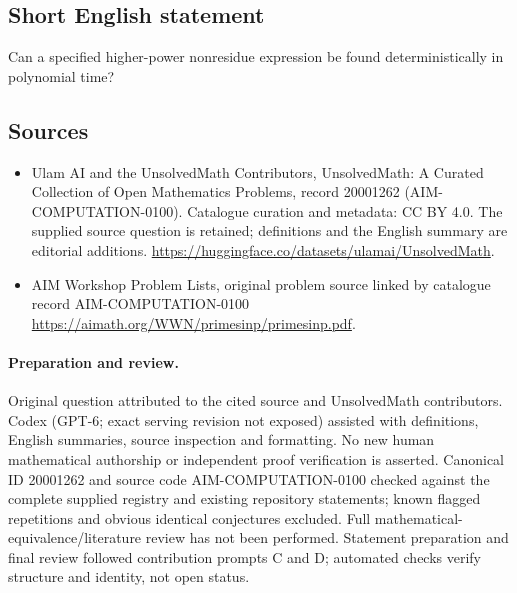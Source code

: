 \documentclass[11pt]{article}
\begin{document}
\subsection{Short English statement}
Can a specified higher-power nonresidue expression be found deterministically in polynomial time?
\subsection{Sources}
\begin{itemize}
\item[\hypertarget{source:20001262:1}{S1}] Ulam AI and the UnsolvedMath Contributors, UnsolvedMath: A Curated Collection of Open Mathematics Problems, record 20001262 (AIM-COMPUTATION-0100). Catalogue curation and metadata: CC BY 4.0. The supplied source question is retained; definitions and the English summary are editorial additions.
\url{https://huggingface.co/datasets/ulamai/UnsolvedMath}.
\item[\hypertarget{source:20001262:2}{S2}] AIM Workshop Problem Lists, original problem source linked by catalogue record AIM-COMPUTATION-0100
\url{https://aimath.org/WWN/primesinp/primesinp.pdf}.
\end{itemize}
\paragraph{Preparation and review.}
Original question attributed to the cited source and UnsolvedMath contributors. Codex (GPT-6; exact serving revision not exposed) assisted with definitions, English summaries, source inspection and formatting. No new human mathematical authorship or independent proof verification is asserted. Canonical ID 20001262 and source code AIM-COMPUTATION-0100 checked against the complete supplied registry and existing repository statements; known flagged repetitions and obvious identical conjectures excluded. Full mathematical-equivalence/literature review has not been performed. Statement preparation and final review followed contribution prompts C and D; automated checks verify structure and identity, not open status.
\label{end:20001262}
\end{document}

